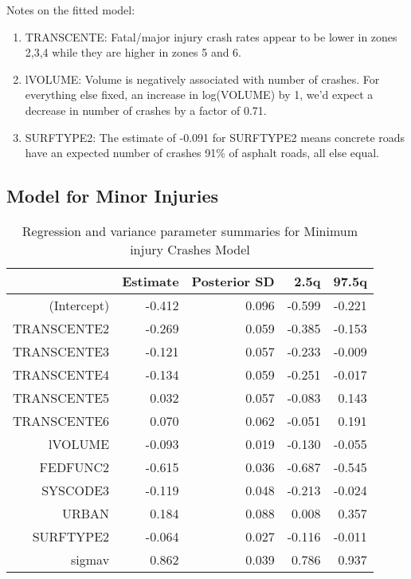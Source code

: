 \documentclass[a4paper]{article}\usepackage[]{graphicx}\usepackage[]{color}
\begin{document}
Notes on the fitted model:

\begin{enumerate}
\item
TRANSCENTE: Fatal/major injury crash rates appear to be lower in zones 2,3,4 while they are higher in zones 5 and 6. 

\item
lVOLUME: Volume is negatively associated with number of crashes. For everything else fixed, an increase in log(VOLUME) by 1, we'd expect a decrease in number of crashes by a factor of 0.71.

\item
SURFTYPE2: The estimate of -0.091 for SURFTYPE2 means concrete roads have an expected number of crashes 91\% of asphalt roads, all else equal.

\end{enumerate}


\clearpage
\subsection{Model for Minor Injuries}

\begin{table}[h]
\centering
\begin{tabular}{rrrrr}
  \hline
 & Estimate & Posterior SD & 2.5q & 97.5q \\ 
  \hline
(Intercept) & -0.412 & 0.096 & -0.599 & -0.221 \\ 
  TRANSCENTE2 & -0.269 & 0.059 & -0.385 & -0.153 \\ 
  TRANSCENTE3 & -0.121 & 0.057 & -0.233 & -0.009 \\ 
  TRANSCENTE4 & -0.134 & 0.059 & -0.251 & -0.017 \\ 
  TRANSCENTE5 & 0.032 & 0.057 & -0.083 & 0.143 \\ 
  TRANSCENTE6 & 0.070 & 0.062 & -0.051 & 0.191 \\ 
  lVOLUME & -0.093 & 0.019 & -0.130 & -0.055 \\ 
  FEDFUNC2 & -0.615 & 0.036 & -0.687 & -0.545 \\ 
  SYSCODE3 & -0.119 & 0.048 & -0.213 & -0.024 \\ 
  URBAN & 0.184 & 0.088 & 0.008 & 0.357 \\ 
  SURFTYPE2 & -0.064 & 0.027 & -0.116 & -0.011 \\ 
  sigmav & 0.862 & 0.039 & 0.786 & 0.937 \\ 
   \hline
\end{tabular}
\caption{Regression and variance parameter summaries for Minimum injury Crashes Model} 
\label{mincrash}
\end{table}
\end{document}
